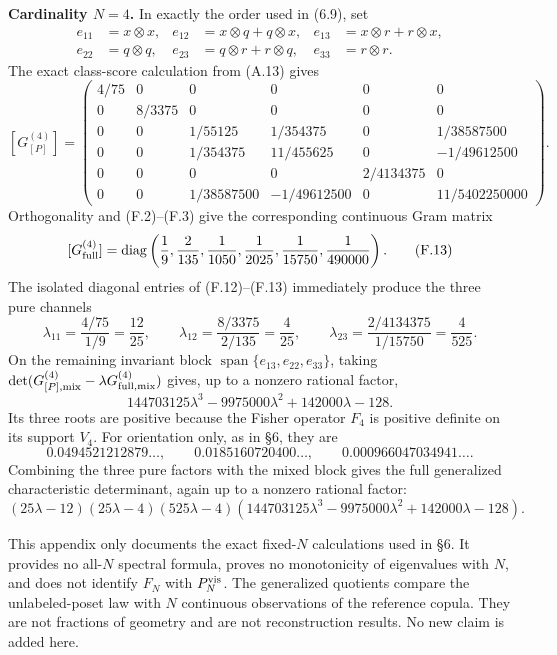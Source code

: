 \documentclass[11pt]{article}
\begin{document}
\textbf{Cardinality \(N=4\).} In exactly the order used in (6.9), set \[ \begin{aligned} e_{11}&=x\otimes x,& e_{12}&=x\otimes q+q\otimes x,& e_{13}&=x\otimes r+r\otimes x,\\ e_{22}&=q\otimes q,& e_{23}&=q\otimes r+r\otimes q,& e_{33}&=r\otimes r. \end{aligned} \tag{F.11} \] The exact class-score calculation from (A.13) gives \[ [G_{[P]}^{(4)}] = \begin{pmatrix} 4/75&0&0&0&0&0\\ 0&8/3375&0&0&0&0\\ 0&0&1/55125&1/354375&0&1/38587500\\ 0&0&1/354375&11/455625&0&-1/49612500\\ 0&0&0&0&2/4134375&0\\ 0&0&1/38587500&-1/49612500&0&11/5402250000 \end{pmatrix}. \tag{F.12} \] Orthogonality and (F.2)--(F.3) give the corresponding continuous Gram matrix \[ [G_{\rm full}^{(4)}] =\operatorname{diag}\left( \frac19,\frac2{135},\frac1{1050}, \frac1{2025},\frac1{15750},\frac1{490000} \right). \tag{F.13} \] The isolated diagonal entries of (F.12)--(F.13) immediately produce the three pure channels \[ \lambda_{11}=\frac{4/75}{1/9}=\frac{12}{25},\qquad \lambda_{12}=\frac{8/3375}{2/135}=\frac4{25},\qquad \lambda_{23}=\frac{2/4134375}{1/15750}=\frac4{525}. \tag{F.14} \] On the remaining invariant block \(\operatorname{span}\{e_{13},e_{22},e_{33}\}\), taking \(\det(G_{[P],\rm mix}^{(4)}-\lambda G_{\rm full,\rm mix}^{(4)})\) gives, up to a nonzero rational factor, \[ 144703125\lambda^3 -9975000\lambda^2 +142000\lambda -128. \tag{F.15} \] Its three roots are positive because the Fisher operator \(F_4\) is positive definite on its support \(V_4\). For orientation only, as in \S6, they are \[ 0.0494521212879\ldots,\qquad 0.0185160720400\ldots,\qquad 0.000966047034941\ldots. \tag{F.16} \] Combining the three pure factors with the mixed block gives the full generalized characteristic determinant, again up to a nonzero rational factor: \[ (25\lambda-12)(25\lambda-4)(525\lambda-4) \left( 144703125\lambda^3 -9975000\lambda^2 +142000\lambda -128 \right). \tag{F.17} \]

This appendix only documents the exact fixed-\(N\) calculations used in \S6. It provides no all-\(N\) spectral formula, proves no monotonicity of eigenvalues with \(N\), and does not identify \(F_N\) with \(P_N^{\rm vis}\). The generalized quotients compare the unlabeled-poset law with \(N\) continuous observations of the reference copula. They are not fractions of geometry and are not reconstruction results. No new claim is added here.
\end{document}
